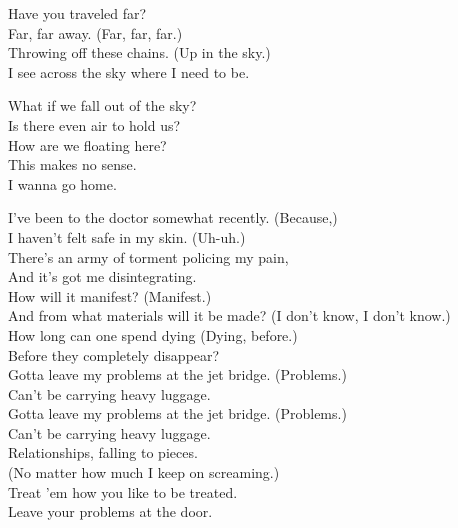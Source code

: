 
Have you traveled far? \\
Far, far away. (Far, far, far.) \\
Throwing off these chains. (Up in the sky.) \\
I see across the sky where I need to be. \\


What if we fall out of the sky? \\
Is there even air to hold us? \\
How are we floating here? \\
This makes no sense. \\
I wanna go home. \\




I've been to the doctor somewhat recently. (Because,) \\
I haven't felt safe in my skin. (Uh-uh.) \\
There's an army of torment policing my pain, \\
And it's got me disintegrating. \\

How will it manifest? (Manifest.) \\
And from what materials will it be made? (I don't know, I don't know.) \\
How long can one spend dying (Dying, before.) \\
Before they completely disappear? \\

Gotta leave my problems at the jet bridge. (Problems.) \\
Can't be carrying heavy luggage. \\
Gotta leave my problems at the jet bridge. (Problems.) \\
Can't be carrying heavy luggage. \\

Relationships, falling to pieces. \\
(No matter how much I keep on screaming.) \\
Treat 'em how you like to be treated. \\
Leave your problems at the door. \\

